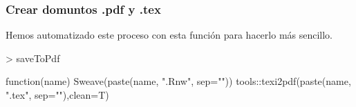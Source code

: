 \documentclass [a4paper] {article}
\begin{document}
\subsubsection{Crear domuntos .pdf y .tex}
Hemos automatizado este proceso con esta función para hacerlo más sencillo.
\begin{Schunk}
\begin{Sinput}
> saveToPdf
\end{Sinput}
\begin{Soutput}
function(name){
  Sweave(paste(name, ".Rnw", sep=""))
  tools::texi2pdf(paste(name, ".tex", sep=""),clean=T)
}
\end{Soutput}
\end{Schunk}
\end{document}
